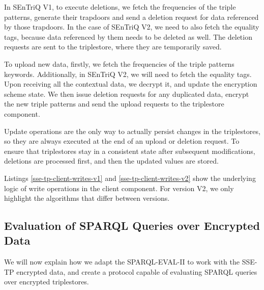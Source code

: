In \gls{SEnTriQ} V1, to execute deletions, we fetch the frequencies of the triple patterns, generate their trapdoors and send a deletion request for data referenced by those trapdoors. In the case of \gls{SEnTriQ} V2, we need to also fetch the equality tags, because data referenced by them needs to be deleted as well. The deletion requests are sent to the triplestore, where they are temporarily saved.

To upload new data, firstly, we fetch the frequencies of the triple patterns keywords. Additionally, in \gls{SEnTriQ} V2, we will need to fetch the equality tags. Upon receiving all the contextual data, we decrypt it, and update the encryption scheme state. We then issue deletion requests for any duplicated data, encrypt the new triple patterns and send the upload requests to the triplestore component.

Update operations are the only way to actually persist changes in the triplestores, so they are always executed at the end of an upload or deletion request. To ensure that triplestores stay in a consistent state after subsequent modifications, deletions are processed first, and then the updated values are stored.

Listings \ref{sse-tp-client-writes-v1} and \ref{sse-tp-client-writes-v2} show the underlying logic of write operations in the client component. For version V2, we only highlight the algorithms that differ between versions.

%

%

\subsection{Evaluation of SPARQL Queries over Encrypted Data}

We will now explain how we adapt the SPARQL-EVAL-II to work with the SSE-TP encrypted data, and create a protocol capable of evaluating \gls{SPARQL} queries over encrypted triplestores.

